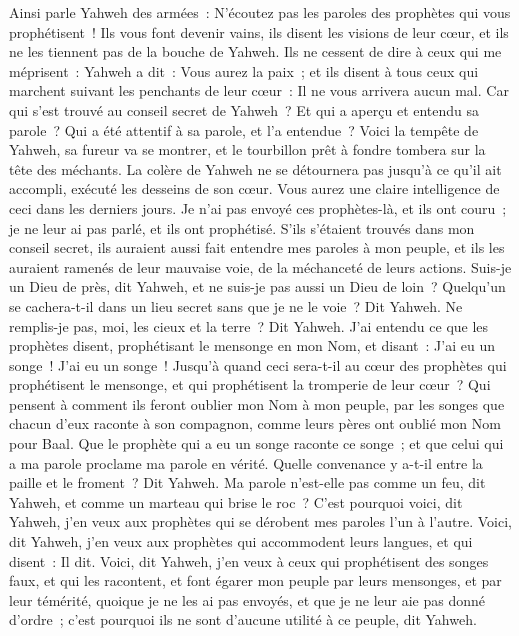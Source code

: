 \begin{multicols}{2}
Ainsi parle Yahweh des armées~: N'écoutez pas les paroles des prophètes qui vous prophétisent~! Ils vous font devenir vains, ils disent les visions de leur cœur, et ils ne les tiennent pas de la bouche de Yahweh.
Ils ne cessent de dire à ceux qui me méprisent~: Yahweh a dit~: Vous aurez la paix~; et ils disent à tous ceux qui marchent suivant les penchants de leur cœur~: Il ne vous arrivera aucun mal.
Car qui s'est trouvé au conseil secret de Yahweh~? Et qui a aperçu et entendu sa parole~? Qui a été attentif à sa parole, et l'a entendue~?
Voici la tempête de Yahweh, sa fureur va se montrer, et le tourbillon prêt à fondre tombera sur la tête des méchants.
La colère de Yahweh ne se détournera pas jusqu'à ce qu'il ait accompli, exécuté les desseins de son cœur. Vous aurez une claire intelligence de ceci dans les derniers jours.
Je n'ai pas envoyé ces prophètes-là, et ils ont couru~; je ne leur ai pas parlé, et ils ont prophétisé.
S'ils s'étaient trouvés dans mon conseil secret, ils auraient aussi fait entendre mes paroles à mon peuple, et ils les auraient ramenés de leur mauvaise voie, de la méchanceté de leurs actions.
Suis-je un Dieu de près, dit Yahweh, et ne suis-je pas aussi un Dieu de loin~?
Quelqu'un se cachera-t-il dans un lieu secret sans que je ne le voie~? Dit Yahweh. Ne remplis-je pas, moi, les cieux et la terre~? Dit Yahweh.
J'ai entendu ce que les prophètes disent, prophétisant le mensonge en mon Nom, et disant~: J'ai eu un songe~! J'ai eu un songe~!
Jusqu'à quand ceci sera-t-il au cœur des prophètes qui prophétisent le mensonge, et qui prophétisent la tromperie de leur cœur~?
Qui pensent à comment ils feront oublier mon Nom à mon peuple, par les songes que chacun d'eux raconte à son compagnon, comme leurs pères ont oublié mon Nom pour Baal.
Que le prophète qui a eu un songe raconte ce songe~; et que celui qui a ma parole proclame ma parole en vérité. Quelle convenance y a-t-il entre la paille et le froment~? Dit Yahweh.
Ma parole n'est-elle pas comme un feu, dit Yahweh, et comme un marteau qui brise le roc~?
C'est pourquoi voici, dit Yahweh, j'en veux aux prophètes qui se dérobent mes paroles l'un à l'autre.
Voici, dit Yahweh, j'en veux aux prophètes qui accommodent leurs langues, et qui disent~: Il dit.
Voici, dit Yahweh, j'en veux à ceux qui prophétisent des songes faux, et qui les racontent, et font égarer mon peuple par leurs mensonges, et par leur témérité, quoique je ne les ai pas envoyés, et que je ne leur aie pas donné d'ordre~; c'est pourquoi ils ne sont d'aucune utilité à ce peuple, dit Yahweh.

\end{multicols}
